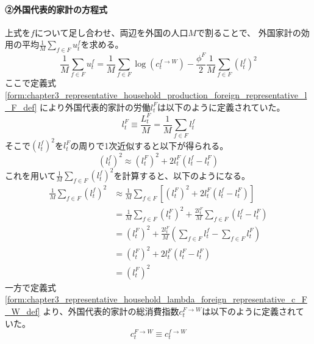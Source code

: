 \paragraph{②外国代表的家計の方程式}
\label{sec:chapter3_representative_household_utility_foreign_representative}
上式を\(f\)について足し合わせ、両辺を外国の人口\(M\)で割ることで、
外国家計の効用の平均\(\frac{1}{M}\sum_{f\in F}u_t^f\)を求める。
\begin{equation}
\label{form:chapter3_representative_household_utility_foreign_representative_average_u_f_eq}
    \frac{1}{M}\sum_{f\in F}u_t^f
    =\frac{1}{M}\sum_{f\in F}\log(c_t^{f\to W})-\frac{\phi^F}{2}\frac{1}{M}\sum_{f\in F}(l_t^f)^2
\end{equation}
ここで定義式
\eqref{form:chapter3_representative_household_production_foreign_representative_l_F_def}
により外国代表的家計の労働\(l_t^F\)は以下のように定義されていた。
\begin{equation}
\label{form:chapter3_representative_household_utility_foreign_representative_l_F_def}
    l_t^F\equiv\frac{L_t^F}{M}=\frac{1}{M}\sum_{f\in F}l_t^f
\end{equation}
そこで\((l_t^f)^2\)を\(l_t^F\)の周りで1次近似すると以下が得られる。
\begin{equation}
\label{form:chapter3_representative_household_utility_foreign_representative_l_F_sq_eq}
    (l_t^f)^2\approx(l_t^F)^2+2l_t^F(l_t^f-l_t^F)
\end{equation}
これを用いて\(\frac{1}{M}\sum_{f\in F}(l_t^f)^2\)を計算すると、以下のようになる。
\begin{equation}
\label{form:chapter3_representative_household_utility_foreign_representative_average_sum_l_F_sq_eq}
\begin{aligned}
    \frac{1}{M}\sum_{f\in F}(l_t^f)^2
    &\approx\frac{1}{M}\sum_{f\in F}\left[(l_t^F)^2+2l_t^F(l_t^f-l_t^F)\right] \\
    &=\frac{1}{M}\sum_{f\in F}(l_t^F)^2+\frac{2l_t^F}{M}\sum_{f\in F}(l_t^f-l_t^F) \\
    &=(l_t^F)^2+\frac{2l_t^F}{M}\left(\sum_{f\in F}l_t^f-\sum_{f\in F}l_t^F\right) \\
    &=(l_t^F)^2+2l_t^F(l_t^F-l_t^F) \\
    &=(l_t^F)^2
\end{aligned}
\end{equation}
一方で定義式
\eqref{form:chapter3_representative_household_lambda_foreign_representative_c_F_W_def}
より、外国代表的家計の総消費指数\(c_t^{F\to W}\)は以下のように定義されていた。
\begin{equation}
\label{form:chapter3_representative_household_utility_foreign_representative_c_F_W_def}
    c_t^{F\to W}\equiv c_t^{f\to W}
\end{equation}
